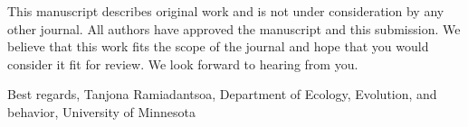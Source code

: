 
This manuscript describes original work and is not under consideration by any other journal.
All authors have approved the manuscript and this submission.
We believe that this work fits the scope of the journal and hope that you would consider it fit for review.
We look forward to hearing from you.

Best regards,
Tanjona Ramiadantsoa,
Department of Ecology, Evolution, and behavior, University of Minnesota
